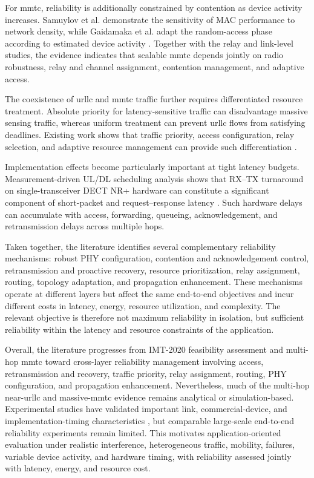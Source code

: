 For \gls{mmtc}, reliability is additionally constrained by contention as device activity increases. Samuylov et al. demonstrate the sensitivity of MAC performance to network density, while Gaidamaka et al. adapt the random-access phase according to estimated device activity \cite{samuylovPerformanceMACLayer2024a, gaidamakaOptimizingDelaysRandom2025}. Together with the relay and link-level studies, the evidence indicates that scalable \gls{mmtc} depends jointly on radio robustness, relay and channel assignment, contention management, and adaptive access.

The coexistence of \gls{urllc} and \gls{mmtc} traffic further requires differentiated resource treatment. Absolute priority for latency-sensitive traffic can disadvantage massive sensing traffic, whereas uniform treatment can prevent \gls{urllc} flows from satisfying deadlines. Existing work shows that traffic priority, access configuration, relay selection, and adaptive resource management can provide such differentiation \cite{samuylovEmpoweringNearURLLCIoT2025, glazkovImprovingNearURLLCServices2025, singhwiDECT2020NewRadio2021}.

Implementation effects become particularly important at tight latency budgets. Measurement-driven UL/DL scheduling analysis shows that RX--TX turnaround on single-transceiver DECT NR+ hardware can constitute a significant component of short-packet and request--response latency \cite{alizaiMeasurementDrivenLatencyAnalysis2026}. Such hardware delays can accumulate with access, forwarding, queueing, acknowledgement, and retransmission delays across multiple hops.

Taken together, the literature identifies several complementary reliability mechanisms: robust PHY configuration, contention and acknowledgement control, retransmission and proactive recovery, resource prioritization, relay assignment, routing, topology adaptation, and propagation enhancement. These mechanisms operate at different layers but affect the same end-to-end objectives and incur different costs in latency, energy, resource utilization, and complexity. The relevant objective is therefore not maximum reliability in isolation, but sufficient reliability within the latency and resource constraints of the application.

Overall, the literature progresses from IMT-2020 feasibility assessment and multi-hop \gls{mmtc} toward cross-layer reliability management involving access, retransmission and recovery, traffic priority, relay assignment, routing, PHY configuration, and propagation enhancement. Nevertheless, much of the multi-hop near-\gls{urllc} and massive-\gls{mmtc} evidence remains analytical or simulation-based. Experimental studies have validated important link, commercial-device, and implementation-timing characteristics \cite{haqueDECT2020NRLink2025, bandaraExperimentalValidationAnalysis2025, grafParetoOptimalityApproach2026a, alizaiMeasurementDrivenLatencyAnalysis2026}, but comparable large-scale end-to-end reliability experiments remain limited. This motivates application-oriented evaluation under realistic interference, heterogeneous traffic, mobility, failures, variable device activity, and hardware timing, with reliability assessed jointly with latency, energy, and resource cost.


